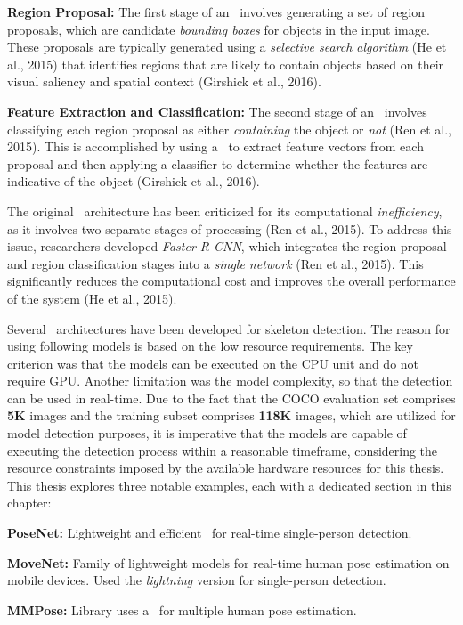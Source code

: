 \startitemize[1]
    \item {\bf Region Proposal:} The first stage of an \RCNN\ involves generating a set of region proposals, which are candidate {\em bounding boxes} for objects in the input image. These proposals are typically generated using a {\em selective search algorithm} (\scc He et al., 2015) that identifies regions that are likely to contain objects based on their visual saliency and spatial context (\scc Girshick et al., 2016).
    \item {\bf Feature Extraction and Classification:} The second stage of an \RCNN\ involves classifying each region proposal as either {\em containing} the object or {\em not} (\scc Ren et al., 2015). This is accomplished by using a \CNN\ to extract feature vectors from each proposal and then applying a classifier to determine whether the features are indicative of the object (\scc Girshick et al., 2016).
\stopitemize

The original \RCNN\ architecture has been criticized for its computational {\em inefficiency}, as it involves two separate stages of processing (\scc Ren et al., 2015). To address this issue, researchers developed {\em Faster R-CNN}, which integrates the region proposal and region classification stages into a {\em single network} (\scc Ren et al., 2015). This significantly reduces the computational cost and improves the overall performance of the system (\scc He et al., 2015).

Several \NN\ architectures have been developed for skeleton detection. The reason for using following models is based on the low resource requirements. The key criterion was that the models can be executed on the CPU unit and do not require GPU. Another limitation was the model complexity, so that the detection can be used in real-time. Due to the fact that the COCO evaluation set comprises {\bf 5K} images and the training subset comprises {\bf 118K} images, which are utilized for model detection purposes, it is imperative that the models are capable of executing the detection process within a reasonable timeframe, considering the resource constraints imposed by the available hardware resources for this thesis. This thesis explores three notable examples, each with a dedicated section in this chapter:

\startitemize[n]
    \item {\bf PoseNet:} Lightweight and efficient \CNN\ for real-time single-person detection.
    \item {\bf MoveNet:} Family of lightweight models for real-time human pose estimation on mobile devices. Used the {\em lightning} version for single-person detection.
    \item {\bf MMPose:} Library uses a \CNN\ for multiple human pose estimation.
\stopitemize

